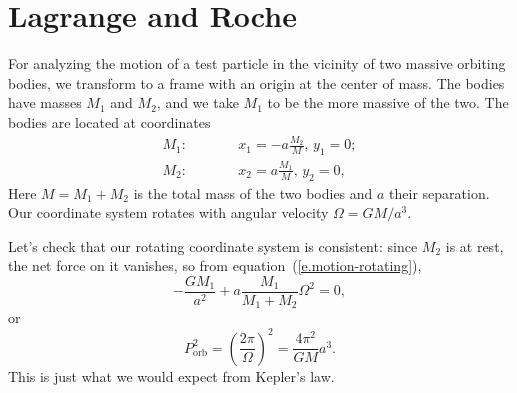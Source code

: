 \section{Lagrange and Roche}
For analyzing the motion of a test particle in the vicinity of two massive orbiting bodies, we transform to a frame with an origin at the center of mass.  The bodies have masses $M_{1}$ and $M_{2}$, and we take $M_{1}$ to be the more massive of the two. The bodies are located at coordinates
\begin{eqnarray}
	M_{1}:&\qquad& x_{1} = -a\frac{M_{2}}{M},\,y_{1} = 0;\\
	M_{2}:&\qquad& x_{2} = a\frac{M_{1}}{M},\,y_{2} = 0,
\end{eqnarray}
Here $M = M_{1}+M_{2}$ is the total mass of the two bodies and $a$ their separation. Our coordinate system rotates with angular velocity $\Omega = GM/a^{3}$.

Let's check that our rotating coordinate system is consistent: since $M_{2}$ is at rest, the net force on it vanishes, so from equation~(\ref{e.motion-rotating}),
\[ -\frac{GM_{1}}{a^{2}} + a\frac{M_{1}}{M_{1}+M_{2}}\Omega^{2} = 0, \]
or
\[ P_{\mathrm{orb}}^{2} = \left(\frac{2\pi}{\Omega}\right)^{2} = \frac{4\pi^{2}}{GM}a^{3}. \]
This is just what we would expect from Kepler's law.

